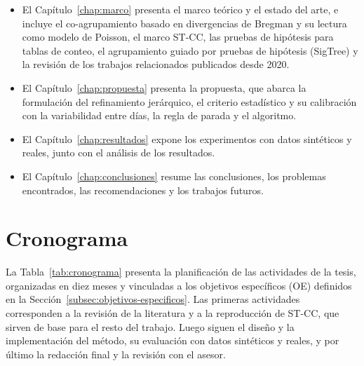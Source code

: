 \begin{itemize}
    \item El Capítulo~\ref{chap:marco} presenta el marco teórico y el estado
          del arte, e incluye el co-agrupamiento basado en divergencias de
          Bregman y su lectura como modelo de Poisson, el marco \ac{ST-CC}, las
          pruebas de hipótesis para tablas de conteo, el agrupamiento guiado
          por pruebas de hipótesis (SigTree) y la revisión de los trabajos
          relacionados publicados desde 2020.
    \item El Capítulo~\ref{chap:propuesta} presenta la propuesta, que abarca la
          formulación del refinamiento jerárquico, el criterio estadístico y
          su calibración con la variabilidad entre días, la regla de parada y
          el algoritmo.
    \item El Capítulo~\ref{chap:resultados} expone los experimentos con
          datos sintéticos y reales, junto con el análisis de los
          resultados.
    \item El Capítulo~\ref{chap:conclusiones} resume las conclusiones, los
          problemas encontrados, las recomendaciones y los trabajos futuros.
\end{itemize}

\section{Cronograma}
\label{sec:cronograma}

La Tabla~\ref{tab:cronograma} presenta la planificación de las actividades
de la tesis, organizadas en diez meses y vinculadas a los objetivos
específicos (\ac{OE}) definidos en la Sección~\ref{subsec:objetivos-especificos}. Las
primeras actividades corresponden a la revisión de la literatura y a la
reproducción de \ac{ST-CC}, que sirven de base para el resto del trabajo. Luego
siguen el diseño y la implementación del método, su evaluación con datos
sintéticos y reales, y por último la redacción final y la revisión con el
asesor.

